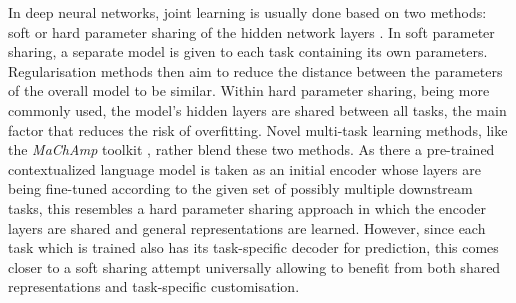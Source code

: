 \documentclass[11pt,a4paper,twoside,openright]{scrbook}
\begin{document}
In deep neural networks, joint learning is usually done based on two methods: soft or hard parameter sharing of the hidden network layers \citep{ruder2017overviewmultitasklearningdeep}. In soft parameter sharing, a separate model is given to each task containing its own parameters. Regularisation methods then aim to reduce the distance between the parameters of the overall model to be similar. Within hard parameter sharing, being more commonly used, the model's hidden layers are shared between all tasks, the main factor that reduces the risk of overfitting. Novel multi-task learning methods, like the \textit{MaChAmp} toolkit \citep{van-der-goot-etal-2021-massive}, rather blend these two methods. As there a pre-trained contextualized language model is taken as an initial encoder whose layers are being fine-tuned according to the given set of possibly multiple downstream tasks, this resembles a hard parameter sharing approach in which the encoder layers are shared and general representations are learned. However, since each task which is trained also has its task-specific decoder for prediction, this comes closer to a soft sharing attempt universally allowing to benefit from both shared representations and task-specific customisation. 
\end{document}
